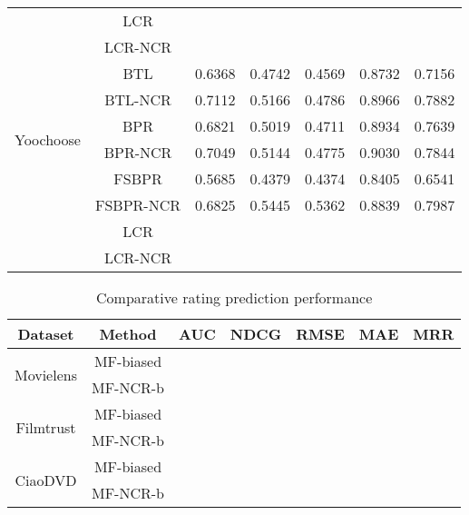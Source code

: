 \documentclass[letterpaper]{article} %
\begin{document}
\begin{table}[htp]
\begin{center}
\begin{tabular}{|c|c|c|c|c|c|c|}
   & LCR & & & & & \\\cline{2-7}
 & LCR-NCR & & & & & \\\hline
\multirow{6}{*}{Yoochoose} & BTL &0.6368 &0.4742 &0.4569 &0.8732 &0.7156 \\\cline{2-7}
 & BTL-NCR &0.7112 &0.5166 &0.4786 &0.8966 &0.7882 \\\cline{2-7}
 & BPR &0.6821 &0.5019 &0.4711 &0.8934 &0.7639 \\\cline{2-7}
 & BPR-NCR &0.7049 &0.5144 &0.4775 &0.9030 &0.7844 \\\cline{2-7}
 & FSBPR &0.5685 &0.4379 &0.4374 &0.8405 &0.6541\\\cline{2-7}
  & FSBPR-NCR &0.6825 &0.5445 &0.5362 &0.8839 &0.7987  \\\cline{2-7}
   & LCR & & & & & \\\cline{2-7}
 & LCR-NCR & & & & & \\\hline
\end{tabular}
\end{center}
\label{tab:ratingresult}
\end{table}%





\begin{table}[htp]
\tiny
\caption{Comparative rating prediction performance}
\begin{center}
\begin{tabular}{|c|c|c|c|c|c|c|}
\hline
Dataset & Method & AUC & NDCG & RMSE & MAE & MRR \\\hline
\multirow{2}{*}{Movielens} & MF-biased &  & 	 &	 &	 &	
 \\\cline{2-7}
 & MF-NCR-b & & 	 &	 &	 &	
 \\\hline
\multirow{2}{*}{Filmtrust} & MF-biased & &	 &	 	&  &	
 \\\cline{2-7}
 & MF-NCR-b &  & 	 &	 & 	 & 	
\\\hline
 \multirow{2}{*}{CiaoDVD} & MF-biased & & 	 &	 & 	 	 &
\\\cline{2-7}
 & MF-NCR-b & & 	 &	 &	 	&
 \\\hline
\end{tabular}
\end{center}
\label{tab:biasresult}
\end{table}%
\end{document}
